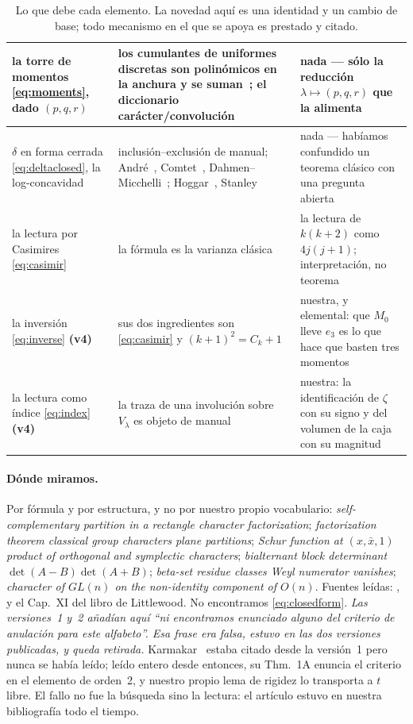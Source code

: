 \documentclass[11pt,a4paper]{article}
\begin{document}
\begin{table}[!htbp]
\begin{tabular}{p{4.0cm}p{5.2cm}p{5.0cm}}
\midrule
la torre de momentos \eqref{eq:moments}, dado $(p,q,r)$ &
los cumulantes de uniformes discretas son polin\'omicos en la anchura y se
suman~\cite{Neuschel}; el diccionario car\'acter/convoluci\'on~\cite{BradleyGupta} &
nada --- s\'olo la reducci\'on $\lambda\mapsto(p,q,r)$ que la alimenta\\
\midrule
\rowcolor{softgrey}
$\delta$ en forma cerrada \eqref{eq:deltaclosed}, la log-concavidad &
inclusi\'on--exclusi\'on de manual; Andr\'e~\cite{Andre}, Comtet~\cite{Comtet},
Dahmen--Micchelli~\cite{DahmenMicchelli}; Hoggar~\cite{Hoggar}, Stanley~\cite{Stanley} &
nada --- hab\'iamos confundido un teorema cl\'asico con una pregunta abierta\\
\midrule
la lectura por Casimires \eqref{eq:casimir} & la f\'ormula es la varianza
cl\'asica~\cite{Neuschel} & la lectura de $k(k+2)$ como $4j(j+1)$; interpretaci\'on, no
teorema\\
\midrule
\rowcolor{softgrey}
la inversi\'on \eqref{eq:inverse} \textbf{(v4)} & sus dos ingredientes son \eqref{eq:casimir} y
$(k+1)^2=C_k+1$ & nuestra, y elemental: que $M_0$ lleve $e_3$ es lo que hace que basten tres
momentos\\
\midrule
la lectura como \'indice \eqref{eq:index} \textbf{(v4)} & la traza de una involuci\'on sobre
$V_\lambda$ es objeto de manual & nuestra: la identificaci\'on de $\zeta$ con su signo y del
volumen de la caja con su magnitud\\
\bottomrule
\end{tabular}
\caption{Lo que debe cada elemento. La novedad aqu\'i es una identidad y un cambio de base;
todo mecanismo en el que se apoya es prestado y citado.}
\label{tab:ledger}
\end{table}

\paragraph{D\'onde miramos.} Por f\'ormula y por estructura, y no por nuestro propio
vocabulario: \emph{self-complementary partition in a rectangle character factorization};
\emph{factorization theorem classical group characters plane partitions}; \emph{Schur function
at $(x,\bar x,1)$ product of orthogonal and symplectic characters}; \emph{bialternant block
determinant $\det(A-B)\det(A+B)$}; \emph{beta-set residue classes Weyl numerator vanishes};
\emph{character of $GL(n)$ on the non-identity component of $O(n)$}. Fuentes le\'idas:
\cite{CK,AB,AK,Kumari,Albion,Karmakar}, y el Cap.~XI del libro de Littlewood. No encontramos
\eqref{eq:closedform}. \emph{Las versiones~1 y~2 a\~nad\'ian aqu\'i ``ni encontramos enunciado alguno
del criterio de anulaci\'on para este alfabeto''. Esa frase era falsa, estuvo en las dos versiones
publicadas, y queda retirada.} Karmakar~\cite{Karmakar} estaba citado desde la versi\'on~1 pero nunca
se hab\'ia le\'ido; le\'ido entero
desde entonces, su Thm.~1A enuncia el criterio en el elemento de orden~2, y nuestro propio lema de
rigidez lo transporta a $t$ libre. El fallo no fue la b\'usqueda sino la lectura: el art\'iculo
estuvo en nuestra bibliograf\'ia todo el tiempo.
\end{document}
